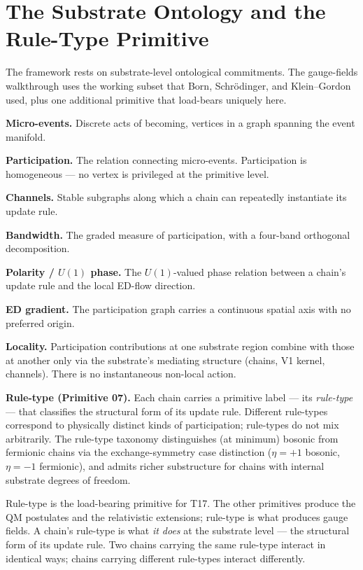 \documentclass[11pt,a4paper]{article}
\begin{document}
\section{The Substrate Ontology and the Rule-Type Primitive}

The framework rests on substrate-level ontological commitments. The gauge-fields walkthrough uses the working subset that Born, Schr\"odinger, and Klein--Gordon used, plus one additional primitive that load-bears uniquely here.

\textbf{Micro-events.} Discrete acts of becoming, vertices in a graph spanning the event manifold.

\textbf{Participation.} The relation connecting micro-events. Participation is homogeneous --- no vertex is privileged at the primitive level.

\textbf{Channels.} Stable subgraphs along which a chain can repeatedly instantiate its update rule.

\textbf{Bandwidth.} The graded measure of participation, with a four-band orthogonal decomposition.

\textbf{Polarity / $U(1)$ phase.} The $U(1)$-valued phase relation between a chain's update rule and the local ED-flow direction.

\textbf{ED gradient.} The participation graph carries a continuous spatial axis with no preferred origin.

\textbf{Locality.} Participation contributions at one substrate region combine with those at another only via the substrate's mediating structure (chains, V1 kernel, channels). There is no instantaneous non-local action.

\textbf{Rule-type (Primitive 07).} Each chain carries a primitive label --- its \emph{rule-type} --- that classifies the structural form of its update rule. Different rule-types correspond to physically distinct kinds of participation; rule-types do not mix arbitrarily. The rule-type taxonomy distinguishes (at minimum) bosonic from fermionic chains via the exchange-symmetry case distinction ($\eta = +1$ bosonic, $\eta = -1$ fermionic), and admits richer substructure for chains with internal substrate degrees of freedom.

Rule-type is the load-bearing primitive for T17. The other primitives produce the QM postulates and the relativistic extensions; rule-type is what produces gauge fields. A chain's rule-type is what \emph{it does} at the substrate level --- the structural form of its update rule. Two chains carrying the same rule-type interact in identical ways; chains carrying different rule-types interact differently.
\end{document}
